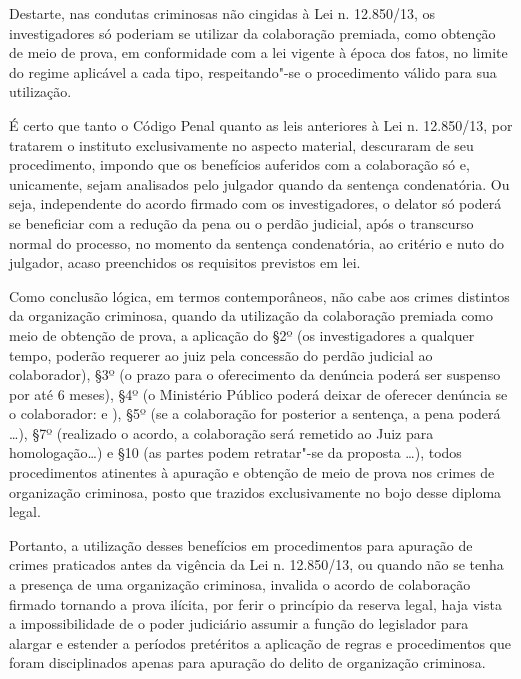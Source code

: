 Destarte, nas condutas criminosas não cingidas à Lei n. 12.850/13, os
investigadores só poderiam se utilizar da colaboração premiada, como
obtenção de meio de prova, em conformidade com a lei vigente à época dos
fatos, no limite do regime aplicável a cada tipo, respeitando"-se o
procedimento válido para sua utilização.

É certo que tanto o Código Penal quanto as leis anteriores à Lei n.
12.850/13, por tratarem o instituto exclusivamente no aspecto material,
descuraram de seu procedimento, impondo que os benefícios auferidos com
a colaboração só e, unicamente, sejam analisados pelo julgador quando da
sentença condenatória. Ou seja, independente do acordo firmado com os
investigadores, o delator só poderá se beneficiar com a redução da pena
ou o perdão judicial, após o transcurso normal do processo, no momento
da sentença condenatória, ao critério e nuto do julgador, acaso
preenchidos os requisitos previstos em lei.

Como conclusão lógica, em termos contemporâneos, não cabe aos crimes
distintos da organização criminosa, quando da utilização da colaboração
premiada como meio de obtenção de prova, a aplicação do §2º (os
investigadores a qualquer tempo, poderão requerer ao juiz pela concessão
do perdão judicial ao colaborador), §3º (o prazo para o oferecimento da
denúncia poderá ser suspenso por até 6 meses), §4º (o Ministério Público
poderá deixar de oferecer denúncia se o colaborador:  e ), §5º (se a
colaboração for posterior a sentença, a pena poderá \ldots{}), §7º (realizado
o acordo, a colaboração será remetido ao Juiz para homologação\ldots{}) e §10
(as partes podem retratar"-se da proposta \ldots{}), todos procedimentos
atinentes à apuração e obtenção de meio de prova nos crimes de
organização criminosa, posto que trazidos exclusivamente no bojo desse
diploma legal.

Portanto, a utilização desses benefícios em procedimentos para apuração
de crimes praticados antes da vigência da Lei n. 12.850/13, ou quando
não se tenha a presença de uma organização criminosa, invalida o acordo
de colaboração firmado tornando a prova ilícita, por ferir o princípio
da reserva legal, haja vista a impossibilidade de o poder judiciário
assumir a função do legislador para alargar e estender a períodos
pretéritos a aplicação de regras e procedimentos que foram disciplinados
apenas para apuração do delito de organização criminosa.

